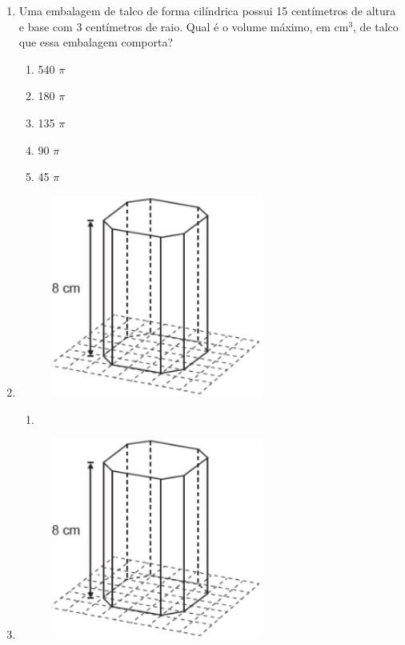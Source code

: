 \documentclass[twocolumn,oneside,a4paper,12.0pt]{article}
\begin{document}
\begin{enumerate}

\item Uma embalagem de talco de forma cilíndrica possui 15 centímetros de altura e base com 3 centímetros de raio. Qual é o volume máximo, em cm$^3$, de talco que essa embalagem comporta? 

\begin{enumerate}
\item  540 $\pi$
\item 180 $\pi$
\item 135 $\pi$
\item 90 $\pi$
\item 45 $\pi$
\end{enumerate}


\item 

	\begin{figure}[!htb]
	\center
	\includegraphics[width=7cm]{Extras/v3.png}
	\end{figure}


\begin{enumerate}
\item 
\end{enumerate}



\item 

	\begin{figure}[!htb]
	\center
	\includegraphics[width=7cm]{Extras/v3.png}
	\end{figure}



\end{enumerate}
\end{document}
